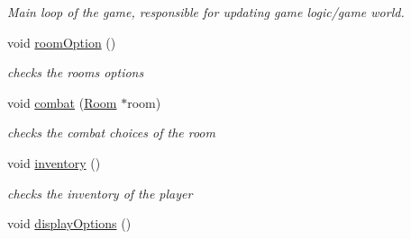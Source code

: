 \begin{DoxyCompactItemize}
\begin{DoxyCompactList}\small\item\em Main loop of the game, responsible for updating game logic/game world. \item\end{DoxyCompactList}\item 
\hypertarget{classGame_a5df081378ffd4d3578bbcf30841129ec}{
void \hyperlink{classGame_a5df081378ffd4d3578bbcf30841129ec}{roomOption} ()}
\label{classGame_a5df081378ffd4d3578bbcf30841129ec}

\begin{DoxyCompactList}\small\item\em checks the rooms options \item\end{DoxyCompactList}\item 
\hypertarget{classGame_a4701824c958fd11467a87ba6a9c1b3d6}{
void \hyperlink{classGame_a4701824c958fd11467a87ba6a9c1b3d6}{combat} (\hyperlink{classRoom}{Room} $\ast$room)}
\label{classGame_a4701824c958fd11467a87ba6a9c1b3d6}

\begin{DoxyCompactList}\small\item\em checks the combat choices of the room \item\end{DoxyCompactList}\item 
\hypertarget{classGame_a1beb150e5072032138e86b11b874f6ad}{
void \hyperlink{classGame_a1beb150e5072032138e86b11b874f6ad}{inventory} ()}
\label{classGame_a1beb150e5072032138e86b11b874f6ad}

\begin{DoxyCompactList}\small\item\em checks the inventory of the player \item\end{DoxyCompactList}\item 
\hypertarget{classGame_a0442d3750942b794836ed953f55e3ad8}{
void \hyperlink{classGame_a0442d3750942b794836ed953f55e3ad8}{displayOptions} ()}
\label{classGame_a0442d3750942b794836ed953f55e3ad8}


\end{DoxyCompactItemize}
